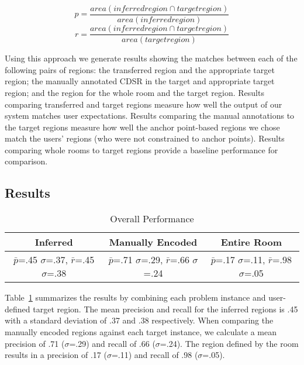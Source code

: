 \begin{equation}
	p=\frac{area(inferred region \cap target region)}{area(inferred region)}
\end{equation}
\begin{equation}
	r=\frac{area(inferred region \cap target region)}{area(target region)}
\end{equation}

Using this approach we generate results showing the matches between each of the following pairs of regions: the transferred region and the appropriate target region; the manually annotated CDSR in the target and appropriate target region; and the region for the whole room and the target region. 
 Results comparing transferred and target regions measure how well the output of our system matches user expectations. Results comparing the manual annotations to the target regions measure how well the anchor point-based regions we chose match the users' regions (who were not constrained to anchor points). Results comparing whole rooms to target regions provide a baseline performance for comparison. 


\subsection{Results}
\begin{table}
\small
\begin{tabular}{|c|c|c|}
\hline
Inferred & Manually Encoded & Entire Room \\
\hline
$\bar{p}$=.45 $\sigma$=.37, $\bar{r}$=.45 $\sigma$=.38 & $\bar{p}$=.71 $\sigma$=.29, $\bar{r}$=.66 $\sigma$=.24  & $\bar{p}$=.17 $\sigma$=.11, $\bar{r}$=.98 $\sigma$=.05  \\
\hline
\end{tabular}
\caption{Overall Performance}
  \label{tab:overall}	

\end{table}


Table~\ref{tab:overall} summarizes the results by combining each problem instance and user-defined target region. The mean precision and recall for the inferred regions is .45 with a standard deviation of .37 and .38 respectively. When comparing the manually encoded regions against each target instance, we calculate a mean precision of .71 ($\sigma$=.29) and recall of .66 ($\sigma$=.24). The region defined by the room results in a precision of .17 ($\sigma$=.11) and recall of .98 ($\sigma$=.05).


